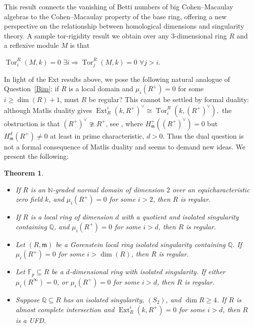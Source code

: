 \documentclass[11pt,a4paper]{amsart}
\numberwithin{equation}{section}
\newtheorem{theorem}{Theorem}[section]
\theoremstyle{definition}
\theoremstyle{remark}
\newcommand{\Tor}{\operatorname{Tor}}
\begin{document}
	This result connects the vanishing of Betti numbers of big Cohen--Macaulay algebras to the Cohen--Macaulay property of the base ring, offering a new perspective on the relationship between homological dimensions and singularity theory. A sample tor-rigidity result we obtain over any \(3\)-dimensional ring $R$ and   a reflexive module \(M\) is that
	\begin{center}	\(
		\Tor_i^R(M,k)=0
		\)
		  \(\exists i \Rightarrow
		\Tor_j^R(M,k)=0
		\)  \(\forall j>i\).
\end{center}
	

	
	In light of the Ext results above, we pose the following natural analogue of Question~\ref{Bim}: if \(R\) is a local domain and \(\mu_i(R^+)=0\) for some \(i \geq \dim(R)+1\), must \(R\) be regular? This cannot be settled by formal duality: although Matlis duality gives
	\(
	\operatorname{Ext}_R^i(k, R^+)^\vee \cong \operatorname{Tor}_i^R(k, (R^+)^\vee),
	\)
	the obstruction is that \((R^+)^\vee \ncong R^+\), see \cite[Corollary 4.12]{Bim}, where \(H^+_{\mathfrak m}((R^+)^\vee)=0\) but \(H^d_{\mathfrak m}(R^+)\neq 0\) at least in prime characteristic, \(d>0\). Thus the dual question is not a formal consequence of Matlis duality and seems to demand new ideas.
We present the following:
\begin{theorem}	\label{18}\begin{itemize}
\item[(i)]  If \(R\) is an \(\mathbb{N}\)-graded normal domain of dimension \(2\) over an equicharacteristic zero field \(k\), and \(\mu_{i}(R^{+})=0\) for some \(i> 2\), then \(R\) is regular.
\item[(ii)] If \(R\) is a local ring of dimension \(d\) with a quotient and isolated singularity containing \(\mathbb{Q}\), and \(\mu_{i}(R^{+})=0\) for some \(i>d\), then \(R\) is regular.
			
\item[(iii)] 	Let \((R,\mathfrak{m})\) be a Gorenstein local ring  isolated singularity containing \(\mathbb{Q}\). If \(\mu_{i}(R^{+})=0\) for some \(i>\dim(R)\), then \(R\) is regular.
\item[(iv)] 	Let $\mathbb{F}_p\subseteq R$ be a $d$-dimensional ring with isolated singularity. If 
either	$
\mu_{i}(R^\infty) = 0$, or $
		\mu_{i}(R^+) = 0$
for some $i > d$, then $R$ is regular.
\item[(v)] 	Suppose \(\mathbb{Q}\subseteq R\) has an isolated singularity,  $(S_2)$, and \(\dim R\ge 4\). If \(R\) is  almost complete intersection and \(\operatorname{Ext}_R^i(k,R^+)=0\) for some \(i>d\), then \(R\) is a UFD.
			
				\end{itemize}
	\end{theorem}
	
\end{document}
